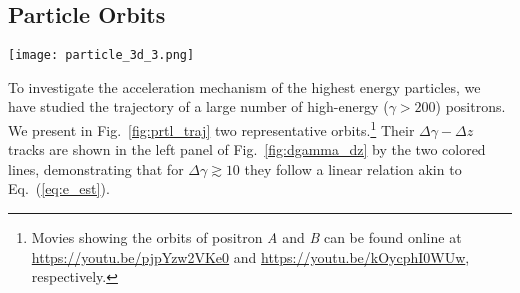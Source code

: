 \documentclass[twocolumn,twocolappendix]{aastex63}
\newcommand{\eq}[1]{Eq.~(\ref{eq:#1})}
\newcommand{\ls}{\textcolor{teal}}
\begin{document}



\subsection{Particle Orbits}\label{3.2}

\begin{figure*}
    \centering
    \texttt{[image: particle\_3d\_3.png]}
    \caption{Trajectories of two representative positrons. For each particle, its trajectory in the $x-y$ plane is shown in the left panel, and in the $y-z$ plane in the middle panel. The color of the line represents the particle energy (from red to white as the energy increases). A white filled circle shows the position at a specific time: $t=2.28L/c$  for particle \textit{A}, corresponding to a time $\Delta t = 0.87L/c$ in the particle life; and $t=2.80L/c$ for particle \textit{B}, corresponding to $\Delta t = 1.03L/c$. The background color shows the plasma density at that same time, in the $x-y$ and $y-z$ slices where the particle is located. In the right panel, we show the particle Lorentz factor as a function of its lifetime $\Delta t$ since it first crossed a threshold $\gamma=3$. The maximum expected acceleration rate corresponding to \eq{ratemax} is shown with a red dashed line.
    }
    \label{fig:prtl_traj} 
\end{figure*}

To investigate the acceleration mechanism of the highest energy particles, we have studied the trajectory of a large number of high-energy ($\gamma>200$) positrons. We present in Fig.~\ref{fig:prtl_traj} two representative orbits.\footnote{Movies showing the orbits of positron \emph{A} and \emph{B} can be found online at \url{https://youtu.be/pjpYzw2VKe0} and \url{https://youtu.be/kOycphI0WUw}, respectively.} Their $ \Delta \gamma- \Delta z$ tracks are shown in the left panel of Fig.~\ref{fig:dgamma_dz} by the two colored lines, demonstrating that for $\Delta \gamma\gtrsim 10$ they follow a linear relation akin to \eq{e_est}.
\end{document}
